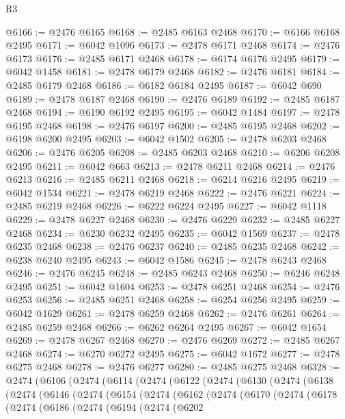 \begin{lexlean}{R3}
\begin{coremodule}
@6166 := @2476 @6165
@6168 := @2485 @6163 @2468
@6170 := @6166 @6168 @2495
@6171 := @6042 @1096
@6173 := @2478 @6171 @2468
@6174 := @2476 @6173
@6176 := @2485 @6171 @2468
@6178 := @6174 @6176 @2495
@6179 := @6042 @1458
@6181 := @2478 @6179 @2468
@6182 := @2476 @6181
@6184 := @2485 @6179 @2468
@6186 := @6182 @6184 @2495
@6187 := @6042 @690
@6189 := @2478 @6187 @2468
@6190 := @2476 @6189
@6192 := @2485 @6187 @2468
@6194 := @6190 @6192 @2495
@6195 := @6042 @1484
@6197 := @2478 @6195 @2468
@6198 := @2476 @6197
@6200 := @2485 @6195 @2468
@6202 := @6198 @6200 @2495
@6203 := @6042 @1502
@6205 := @2478 @6203 @2468
@6206 := @2476 @6205
@6208 := @2485 @6203 @2468
@6210 := @6206 @6208 @2495
@6211 := @6042 @663
@6213 := @2478 @6211 @2468
@6214 := @2476 @6213
@6216 := @2485 @6211 @2468
@6218 := @6214 @6216 @2495
@6219 := @6042 @1534
@6221 := @2478 @6219 @2468
@6222 := @2476 @6221
@6224 := @2485 @6219 @2468
@6226 := @6222 @6224 @2495
@6227 := @6042 @1118
@6229 := @2478 @6227 @2468
@6230 := @2476 @6229
@6232 := @2485 @6227 @2468
@6234 := @6230 @6232 @2495
@6235 := @6042 @1569
@6237 := @2478 @6235 @2468
@6238 := @2476 @6237
@6240 := @2485 @6235 @2468
@6242 := @6238 @6240 @2495
@6243 := @6042 @1586
@6245 := @2478 @6243 @2468
@6246 := @2476 @6245
@6248 := @2485 @6243 @2468
@6250 := @6246 @6248 @2495
@6251 := @6042 @1604
@6253 := @2478 @6251 @2468
@6254 := @2476 @6253
@6256 := @2485 @6251 @2468
@6258 := @6254 @6256 @2495
@6259 := @6042 @1629
@6261 := @2478 @6259 @2468
@6262 := @2476 @6261
@6264 := @2485 @6259 @2468
@6266 := @6262 @6264 @2495
@6267 := @6042 @1654
@6269 := @2478 @6267 @2468
@6270 := @2476 @6269
@6272 := @2485 @6267 @2468
@6274 := @6270 @6272 @2495
@6275 := @6042 @1672
@6277 := @2478 @6275 @2468
@6278 := @2476 @6277
@6280 := @2485 @6275 @2468
@6328 := @2474
    (@6106
      (@2474
        (@6114
          (@2474
            (@6122
              (@2474
                (@6130
                  (@2474
                    (@6138
                      (@2474
                        (@6146
                          (@2474
                            (@6154
                              (@2474
                                (@6162
                                  (@2474
                                    (@6170
                                      (@2474
                                        (@6178
                                          (@2474
                                            (@6186
                                              (@2474
                                                (@6194
                                                  (@2474
                                                    (@6202

\end{coremodule}
\end{lexlean}
